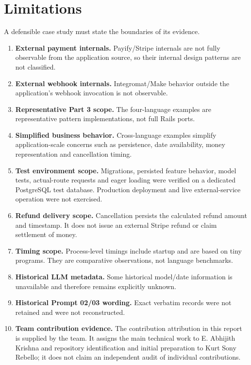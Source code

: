 \documentclass[10pt,a4paper]{article}
\begin{document}
\section{Limitations}

A defensible case study must state the boundaries of its evidence.

\begin{enumerate}[leftmargin=*]
\item \textbf{External payment internals.} Payify/Stripe internals are not fully observable from the application source, so their internal design patterns are not classified.
\item \textbf{External webhook internals.} Integromat/Make behavior outside the application's webhook invocation is not observable.
\item \textbf{Representative Part 3 scope.} The four-language examples are representative pattern implementations, not full Rails ports.
\item \textbf{Simplified business behavior.} Cross-language examples simplify application-scale concerns such as persistence, date availability, money representation and cancellation timing.
\item \textbf{Test environment scope.} Migrations, persisted feature behavior, model tests, actual-route requests and eager loading were verified on a dedicated PostgreSQL test database. Production deployment and live external-service operation were not exercised.
\item \textbf{Refund delivery scope.} Cancellation persists the calculated refund amount and timestamp. It does not issue an external Stripe refund or claim settlement of money.
\item \textbf{Timing scope.} Process-level timings include startup and are based on tiny programs. They are comparative observations, not language benchmarks.
\item \textbf{Historical LLM metadata.} Some historical model/date information is unavailable and therefore remains explicitly unknown.
\item \textbf{Historical Prompt 02/03 wording.} Exact verbatim records were not retained and were not reconstructed.
\item \textbf{Team contribution evidence.} The contribution attribution in this report is supplied by the team. It assigns the main technical work to E. Abhijith Krishna and repository identification and initial preparation to Kurt Sony Rebello; it does not claim an independent audit of individual contributions.
\end{enumerate}
\end{document}
